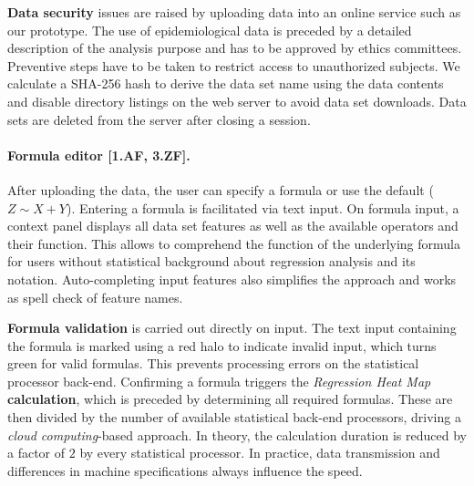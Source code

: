 \documentclass[journal]{style/vgtc} 			          %
\begin{document}

\textbf{Data security} issues are raised by uploading data into an online service such as our prototype.
The use of epidemiological data is preceded by a detailed description of the analysis purpose and has to be approved by ethics committees.
Preventive steps have to be taken to restrict access to unauthorized subjects.
We calculate a SHA-256 hash to derive the data set name using the data contents and disable directory listings on the web server to avoid data set downloads.
Data sets are deleted from the server after closing a session.

\paragraph{Formula editor [\textbf{1.AF}, \textbf{3.ZF}].}
After uploading the data, the user can specify a formula or use the default ($Z \sim X + Y$).
Entering a formula is facilitated via text input.
On formula input, a context panel displays all data set features as well as the available operators and their function.
This allows to comprehend the function of the underlying formula for users without statistical background about regression analysis and its notation.
Auto-completing input features also simplifies the approach and works as spell check of feature names.

\textbf{Formula validation} is carried out directly on input.
The text input containing the formula is marked using a red halo to indicate invalid input, which turns green for valid formulas.
This prevents processing errors on the statistical processor back-end.
Confirming a formula triggers the \emph{Regression Heat Map} \textbf{calculation}, which is preceded by determining all required formulas.
These are then divided by the number of available statistical back-end processors, driving a \emph{cloud computing}-based approach.
In theory, the calculation duration is reduced by a factor of $2$ by every statistical processor.
In practice, data transmission and differences in machine specifications always influence the speed.
\end{document}
